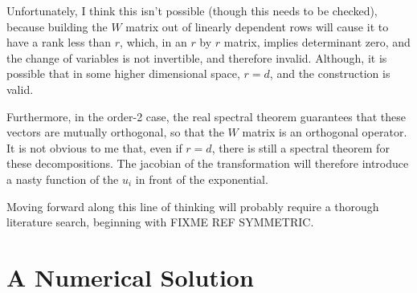 \documentclass[10pt,letterpaper]{article}
\begin{document}
Unfortunately, I think this isn't possible (though this needs to be checked), because building the $W$ matrix out of linearly dependent rows will cause it to have a rank less than $r$, which, in an $r$ by $r$ matrix, implies determinant zero, and the change of variables is not invertible, and therefore invalid. Although, it is possible that in some higher dimensional space, $r=d$, and the construction is valid.

 Furthermore, in the order-2 case, the real spectral theorem guarantees that these vectors are mutually orthogonal, so that the $W$ matrix is an orthogonal operator. It is not obvious to me that, even if $r=d$, there is still a spectral theorem for these decompositions. The jacobian of the transformation will therefore introduce a nasty function of the $u_i$ in front of the exponential. 

 Moving forward along this line of thinking will probably require a thorough literature search, beginning with FIXME REF SYMMETRIC.

















\section{A Numerical Solution}
\end{document}
